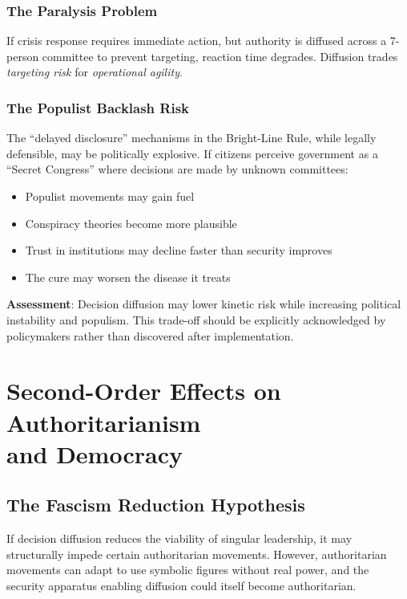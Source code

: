 \documentclass[11pt,letterpaper]{article}
\begin{document}
\subsubsection{The Paralysis Problem}

If crisis response requires immediate action, but authority is diffused across a 7-person committee to prevent targeting, reaction time degrades. Diffusion trades \textit{targeting risk} for \textit{operational agility}.

\subsubsection{The Populist Backlash Risk}

The ``delayed disclosure'' mechanisms in the Bright-Line Rule, while legally defensible, may be politically explosive. If citizens perceive government as a ``Secret Congress'' where decisions are made by unknown committees:

\begin{itemize}
  \item Populist movements may gain fuel
  \item Conspiracy theories become more plausible
  \item Trust in institutions may decline faster than security improves
  \item The cure may worsen the disease it treats
\end{itemize}

\textbf{Assessment}: Decision diffusion may lower kinetic risk while increasing political instability and populism. This trade-off should be explicitly acknowledged by policymakers rather than discovered after implementation.

\section[Second-Order Effects on Authoritarianism and Democracy]{Second-Order Effects on Authoritarianism\\and Democracy}

\subsection{The Fascism Reduction Hypothesis}

If decision diffusion reduces the viability of singular leadership, it may structurally impede certain authoritarian movements. However, authoritarian movements can adapt to use symbolic figures without real power, and the security apparatus enabling diffusion could itself become authoritarian.
\end{document}
